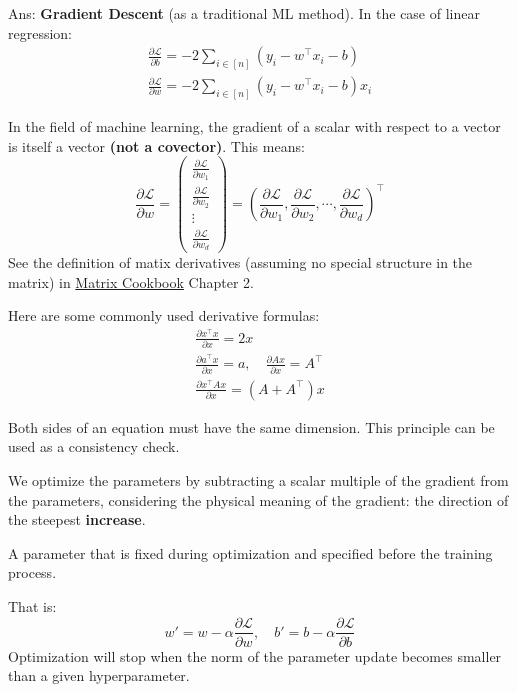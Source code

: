 \documentclass[../main]{subfiles}
\begin{document}
\noindent Ans: \textbf{Gradient Descent} (as a traditional ML method). In the case of linear regression:
\begin{gather}
  \frac{\partial \mathcal L}{\partial b}=-2\sum_{i\in[n]}(y_i-w^\top x_i-b)\\
  \frac{\partial \mathcal L}{\partial w}=-2\sum_{i\in[n]}(y_i-w^\top x_i-b)x_i
\end{gather}
\begin{note}
  In the field of machine learning, the gradient of a scalar with respect to a vector is itself a vector \textbf{(not a covector)}. This means:
  \begin{equation}
    \frac{\partial \mathcal L}{\partial w}=\begin{pmatrix}
      \frac{\partial \mathcal L}{\partial w_1}\\
      \frac{\partial \mathcal L}{\partial w_2}\\
      \vdots\\
      \frac{\partial \mathcal L}{\partial w_d}
    \end{pmatrix}=\left(\frac{\partial \mathcal L}{\partial w_1},
    \frac{\partial \mathcal L}{\partial w_2},
    \cdots,
    \frac{\partial \mathcal L}{\partial w_d}\right)^\top
  \end{equation}
See the definition of matix derivatives (assuming no special structure in the matrix) in \href{https://www.math.uwaterloo.ca/~hwolkowi/matrixcookbook.pdf}{Matrix Cookbook} Chapter 2.
\end{note}
\begin{note}
  Here are some commonly used derivative formulas:
  \begin{gather}
    \frac{\partial x^\top x}{\partial x}=2x\\
    \frac{\partial a^\top x}{\partial x}=a,\quad \frac{\partial Ax}{\partial x}=A^\top\\
    \frac{\partial x^\top Ax}{\partial x}=(A+A^\top)x
  \end{gather}
\end{note}
\begin{remark}
  Both sides of an equation must have the same dimension. This principle can be used as a consistency check.
\end{remark}
We optimize the parameters by subtracting a scalar multiple of the gradient from the parameters, considering the physical meaning of the gradient: the direction of the steepest \textbf{increase}.
\begin{definition}[Hyperparameter]
    A parameter that is fixed during optimization and specified before the training process.
\end{definition} 
That is:
\begin{equation}
    w'=w-\alpha\frac{\partial\mathcal L}{\partial w },\quad b'=b-\alpha\frac{\partial \mathcal L}{\partial b}
\end{equation}
Optimization will stop when the norm of the parameter update becomes smaller than a given hyperparameter.
\end{document}
